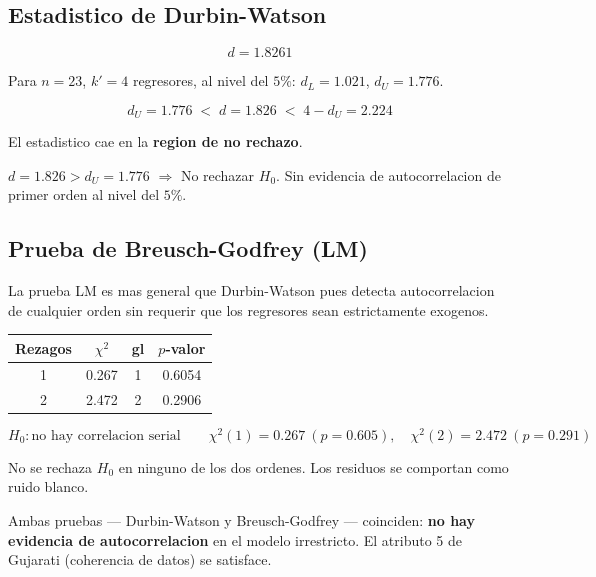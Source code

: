 \documentclass[12pt, letterpaper]{article}
\begin{document}
\subsection{Estadistico de Durbin-Watson}

\begin{equation}
  d = 1.8261
\end{equation}

Para $n = 23$, $k' = 4$ regresores, al nivel del $5\%$:
$d_L = 1.021$, $d_U = 1.776$.

\begin{equation}
  d_U = 1.776 \;<\; d = 1.826 \;<\; 4 - d_U = 2.224
\end{equation}

El estadistico cae en la \textbf{region de no rechazo}.

\begin{clave}
  $d = 1.826 > d_U = 1.776$ $\Rightarrow$ No rechazar $H_0$.
  Sin evidencia de autocorrelacion de primer orden al nivel del $5\%$.
\end{clave}

\subsection{Prueba de Breusch-Godfrey (LM)}

La prueba LM es mas general que Durbin-Watson pues detecta autocorrelacion
de cualquier orden sin requerir que los regresores sean estrictamente exogenos.

\begin{center}
\renewcommand{\arraystretch}{1.3}
\small
\begin{tabular}{cccc}
\toprule
\textbf{Rezagos} & $\chi^2$ & \textbf{gl} & \textbf{$p$-valor} \\
\midrule
1 & 0.267 & 1 & 0.6054 \\
2 & 2.472 & 2 & 0.2906 \\
\bottomrule
\end{tabular}
\end{center}

\begin{equation}
  H_0: \text{no hay correlacion serial} \qquad
  \chi^2(1) = 0.267\ (p = 0.605),\quad
  \chi^2(2) = 2.472\ (p = 0.291)
\end{equation}

No se rechaza $H_0$ en ninguno de los dos ordenes. Los residuos se comportan
como ruido blanco.

\begin{clave}
  Ambas pruebas --- Durbin-Watson y Breusch-Godfrey --- coinciden:
  \textbf{no hay evidencia de autocorrelacion} en el modelo irrestricto.
  El atributo 5 de Gujarati (coherencia de datos) se satisface.
\end{clave}
\end{document}
